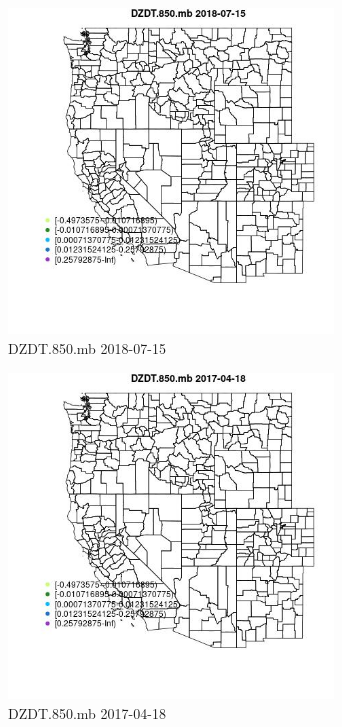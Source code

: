 \begin{figure} 
\centering  
\includegraphics[width=0.77\textwidth]{Code_Outputs/Report_ML_input_PM25_Step4_part_e_de_duplicated_aveswNAs_MapObsDZDT850mb2018-07-15.jpg} 
\caption{\label{fig:Report_ML_input_PM25_Step4_part_e_de_duplicated_aveswNAsMapObsDZDT850mb2018-07-15}DZDT.850.mb 2018-07-15} 
\end{figure} 
 

\clearpage 

\begin{figure} 
\centering  
\includegraphics[width=0.77\textwidth]{Code_Outputs/Report_ML_input_PM25_Step4_part_e_de_duplicated_aveswNAs_MapObsDZDT850mb2017-04-18.jpg} 
\caption{\label{fig:Report_ML_input_PM25_Step4_part_e_de_duplicated_aveswNAsMapObsDZDT850mb2017-04-18}DZDT.850.mb 2017-04-18} 
\end{figure} 
 

